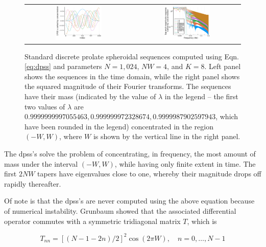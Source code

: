 \documentclass[preprint,12pt]{elsarticle}
\begin{document}
\begin{figure} \centering
\begin{tabular}{cc}
\includegraphics[width=0.45\textwidth]{../figures/Dpss_time.pdf} &
\includegraphics[width=0.45\textwidth]{../figures/Dpss_freq.pdf}
\end{tabular}
\caption{\label{fig:dpss} Standard discrete prolate spheroidal sequences computed
using Eqn. \eqref{eq:dpss} and parameters $N = 1,024$, $NW=4$, and $K=8$. Left panel
shows the sequences in the time domain, while the right panel shows the squared
magnitude of their Fourier transforms. The sequences have their mass (indicated by
the value of $\lambda$ in the legend -- the first two values of $\lambda$ are
$0.9999999997055463, 0.999999972328674, 0.9999987902597943$, which have been rounded
in the legend) concentrated in the
region $(-W,W)$, where $W$ is shown by the vertical line in the right panel.}
\end{figure}

The dpss's solve the problem of concentrating, in frequency, the most amount of mass
under the interval $(-W,W)$, while having only finite extent in time. The first $2NW$
tapers have eigenvalues close to one, whereby their magnitude drops off rapidly
thereafter. 

Of note is that the dpss's are never computed using the above equation because of
numerical instability. Grunbaum \cite{grunbaum81} showed that the associated differential operator
commutes with a symmetric tridiagonal matrix $T$, which is

\begin{equation} T_{nn} = [(N-1-2n)/2]^2 \cos (2\pi W), \quad n = 0, \ldots, N-1\end{equation}
\end{document}
